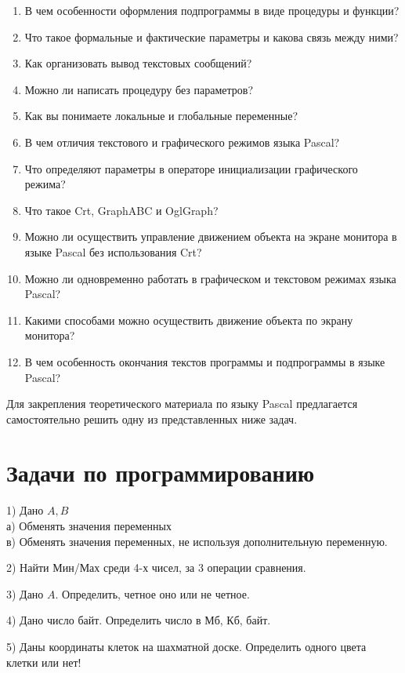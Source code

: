 \begin{enumerate}
\item В чем особенности оформления подпрограммы в виде про­цедуры и функции?
\item Что такое формальные и фактические параметры и какова связь между ними?
\item Как организовать вывод текстовых сообщений?
\item Можно ли написать процедуру без параметров?
\item Как вы понимаете локальные и глобальные переменные?
\item В чем отличия текстового и графического режимов языка Pascal?
\item Что определяют параметры в операторе инициализации гра­фического режима?
\item Что такое Crt, GraphABC и OglGraph?
\item Можно ли осуществить управление движением объекта на экране монитора в языке Pascal без использования Crt?
\item Можно ли одновременно работать в графическом и текстовом режимах языка Pascal?
\item Какими способами можно осуществить движение объекта по экрану монитора?
\item В чем особенность окончания текстов программы и подпрограммы в языке Pascal?
\end{enumerate}

Для закрепления теоретического материала по языку Pascal предлагается самостоятельно решить одну из представленных ниже задач.

\section{Задачи по программированию}

\hspace*{15pt}1) Дано $A, B$\\
\hspace*{25pt}	а) Обменять значения переменных\\
\hspace*{25pt}	в) Обменять значения переменных, не используя дополнительную переменную.
	
2) Найти Мин/Мах среди 4-х чисел, за 3 операции сравнения.

3) Дано $A$. Определить, четное оно или не четное.

4) Дано число байт. Определить число в Мб, Кб, байт.

5) Даны координаты клеток на шахматной доске. Определить одного цвета клетки или нет!

